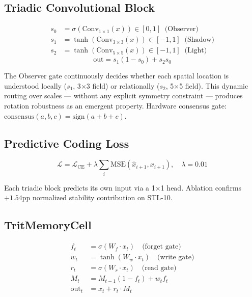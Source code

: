 \documentclass[10pt,twocolumn]{article}
\begin{document}
\subsection{Triadic Convolutional Block}

\begin{align}
  s_0 &= \sigma(\text{Conv}_{1\times1}(x)) \in [0,1]
         \;\; \text{(Observer)} \\
  s_1 &= \tanh(\text{Conv}_{3\times3}(x)) \in [-1,1]
         \;\; \text{(Shadow)} \\
  s_2 &= \tanh(\text{Conv}_{5\times5}(x)) \in [-1,1]
         \;\; \text{(Light)}
\end{align}
\begin{equation}
  \text{out} = s_1(1-s_0) + s_2 s_0
\end{equation}

The Observer gate continuously decides whether each spatial location
is understood locally ($s_1$, 3$\times$3 field) or relationally
($s_2$, 5$\times$5 field). This dynamic routing over scales
--- without any explicit symmetry constraint --- produces rotation
robustness as an emergent property.
Hardware consensus gate: $\text{consensus}(a,b,c) = \text{sign}(a+b+c)$.

\subsection{Predictive Coding Loss}

\begin{equation}
  \mathcal{L} = \mathcal{L}_\text{CE} +
  \lambda\sum_i\text{MSE}(\hat{x}_{i+1}, x_{i+1}),
  \quad \lambda=0.01
\end{equation}

Each triadic block predicts its own input via a 1$\times$1 head.
Ablation confirms $+1.54$pp normalized stability contribution on STL-10.

\subsection{TritMemoryCell}

\begin{align}
  f_t &= \sigma(W_f \cdot x_t) \quad \text{(forget gate)} \\
  w_t &= \tanh(W_w \cdot x_t) \quad \text{(write gate)} \\
  r_t &= \sigma(W_r \cdot x_t) \quad \text{(read gate)} \\
  M_t &= M_{t-1}(1-f_t) + w_t f_t \\
  \text{out}_t &= x_t + r_t \cdot M_t
\end{align}
\end{document}
